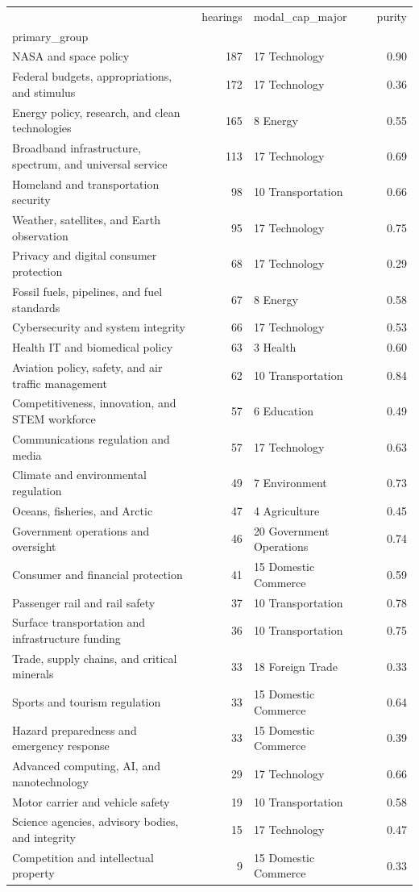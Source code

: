 \begin{tabular}{lrlr}
\toprule
 & hearings & modal_cap_major & purity \\
primary_group &  &  &  \\
\midrule
NASA and space policy & 187 & 17 Technology & 0.90 \\
Federal budgets, appropriations, and stimulus & 172 & 17 Technology & 0.36 \\
Energy policy, research, and clean technologies & 165 & 8 Energy & 0.55 \\
Broadband infrastructure, spectrum, and universal service & 113 & 17 Technology & 0.69 \\
Homeland and transportation security & 98 & 10 Transportation & 0.66 \\
Weather, satellites, and Earth observation & 95 & 17 Technology & 0.75 \\
Privacy and digital consumer protection & 68 & 17 Technology & 0.29 \\
Fossil fuels, pipelines, and fuel standards & 67 & 8 Energy & 0.58 \\
Cybersecurity and system integrity & 66 & 17 Technology & 0.53 \\
Health IT and biomedical policy & 63 & 3 Health & 0.60 \\
Aviation policy, safety, and air traffic management & 62 & 10 Transportation & 0.84 \\
Competitiveness, innovation, and STEM workforce & 57 & 6 Education & 0.49 \\
Communications regulation and media & 57 & 17 Technology & 0.63 \\
Climate and environmental regulation & 49 & 7 Environment & 0.73 \\
Oceans, fisheries, and Arctic & 47 & 4 Agriculture & 0.45 \\
Government operations and oversight & 46 & 20 Government Operations & 0.74 \\
Consumer and financial protection & 41 & 15 Domestic Commerce & 0.59 \\
Passenger rail and rail safety & 37 & 10 Transportation & 0.78 \\
Surface transportation and infrastructure funding & 36 & 10 Transportation & 0.75 \\
Trade, supply chains, and critical minerals & 33 & 18 Foreign Trade & 0.33 \\
Sports and tourism regulation & 33 & 15 Domestic Commerce & 0.64 \\
Hazard preparedness and emergency response & 33 & 15 Domestic Commerce & 0.39 \\
Advanced computing, AI, and nanotechnology & 29 & 17 Technology & 0.66 \\
Motor carrier and vehicle safety & 19 & 10 Transportation & 0.58 \\
Science agencies, advisory bodies, and integrity & 15 & 17 Technology & 0.47 \\
Competition and intellectual property & 9 & 15 Domestic Commerce & 0.33 \\
\bottomrule
\end{tabular}

